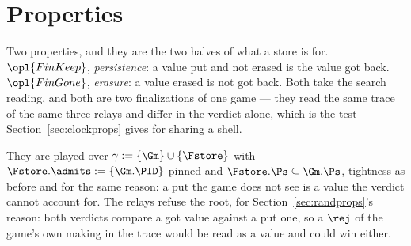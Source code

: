 \documentclass[10pt,oneside,openany]{book}
\theoremstyle{accentdef}
\theoremstyle{accentplain}
\begin{document}
\section{Properties}\label{sec:storeprops}

Two properties, and they are the two halves of what a store is for. $\opl{FinKeep}$,
\emph{persistence}: a value put and not erased is the value got back. $\opl{FinGone}$,
\emph{erasure}: a value erased is not got back. Both take the search reading, and both are two
finalizations of one game --- they read the same trace of the same three relays and differ in the
verdict alone, which is the test Section~\ref{sec:clockprops} gives for sharing a shell.

They are played over $\gamma := \{\Gm\} \cup \{\Fstore\}$ with $\Fstore.\admits := \{\Gm.\PID\}$
pinned and $\Fstore.\Ps \subseteq \Gm.\Ps$, tightness as before and for the same reason: a put the
game does not see is a value the verdict cannot account for. The relays refuse the root, for
Section~\ref{sec:randprops}'s reason: both verdicts compare a got value against a put one, so a
$\rej$ of the game's own making in the trace would be read as a value and could win either.
\end{document}
